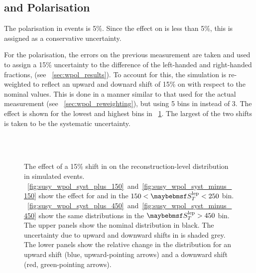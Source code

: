 \subsection[\texorpdfstring{\PW}{W} and \texorpdfstring{\ttbar}{tt} Polarisation]{\boldmath{\PW} and \boldmath{\ttbar} Polarisation}
The polarisation in \ttbar events is 5\%. Since the effect on \RCS is less than
5\%, this is assigned as a conservative uncertainty.

For the \PW polarisation, the errors on the previous measurement are taken and
used to assign a 15\% uncertainty to the difference of the left-handed and
right-handed fractions, \fLmfR (see \sec~\ref{sec:wpol_results}). To account for
this, the simulation is re-weighted to reflect an upward and downard shift of
15\% on \fLmfR with respect to the nominal values. This is done in a manner
similar to that used for the actual measurement (see
\sec~\ref{sec:wpol_reweighting}), but using 5 bins in \PtW instead of 3. The
effect is shown for the lowest and highest \STlep bins in
\fig~\ref{fig:susy_wpol_syst}. The largest of the two shifts is taken to be the
systematic uncertainty.

\begin{figure}[h!]
\centering
{}
\\
\\
\caption[Effect of a 15\% shift in \fLmfR on the electron \LP distribution]{The effect of a 15\% shift in \fLmfR on
  the reconstruction-level \LP distribution in simulated \Wenu
  events. \figs~\ref{fig:susy_wpol_syst_plus_150}~and~\ref{fig:susy_wpol_syst_minus_150}
  show the effect for \APelectron and \Pelectron in the $150 < \STlep < 250$
  bin. \figs~\ref{fig:susy_wpol_syst_plus_450}~and~\ref{fig:susy_wpol_syst_minus_450}
  show the same distributions in the $\STlep > 450$ bin. The upper panels show
  the nominal \LP distribution in black. The uncertainty due to upward and downward
  shifts in \fLmfR is shaded grey. The lower panels show the relative change
  in the distribution for an upward shift (blue, upward-pointing arrows) and a
  downward shift (red, green-pointing arrows).}
\label{fig:susy_wpol_syst}
\end{figure}

